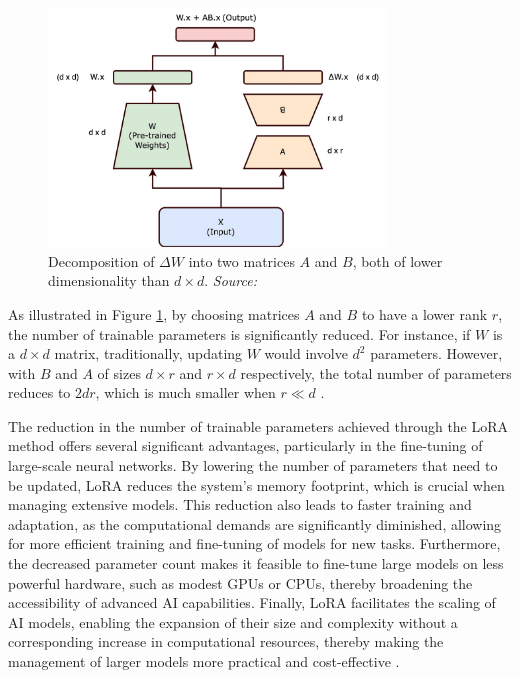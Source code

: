 \begin{figure}[h]
    \centering
    \includegraphics[width=0.8\textwidth]{images/llms/lora.png}
    \caption{Decomposition of \( \Delta W \) into two matrices \( A \) and \( B \), both of lower dimensionality than \( d \times d \). \textit{Source:} \cite{towardsdatascience2024lora}}
    \label{fig:lora_decomposition}
\end{figure}

As illustrated in Figure \ref{fig:lora_decomposition}, by choosing matrices \( A \) and \( B \) to have a lower rank \( r \), the number of trainable parameters is significantly reduced. For instance, if \( W \) is a \( d \times d \) matrix, traditionally, updating \( W \) would involve \( d^2 \) parameters. However, with \( B \) and \( A \) of sizes \( d \times r \) and \( r \times d \) respectively, the total number of parameters reduces to \( 2dr \), which is much smaller when \( r \ll d \) \cite{hu2021lora}. \newline

The reduction in the number of trainable parameters achieved through the LoRA method offers several significant advantages, particularly in the fine-tuning of large-scale neural networks. By lowering the number of parameters that need to be updated, LoRA reduces the system's memory footprint, which is crucial when managing extensive models. This reduction also leads to faster training and adaptation, as the computational demands are significantly diminished, allowing for more efficient training and fine-tuning of models for new tasks. Furthermore, the decreased parameter count makes it feasible to fine-tune large models on less powerful hardware, such as modest GPUs or CPUs, thereby broadening the accessibility of advanced AI capabilities. Finally, LoRA facilitates the scaling of AI models, enabling the expansion of their size and complexity without a corresponding increase in computational resources, thereby making the management of larger models more practical and cost-effective \cite{towardsdatascience2024lora}.

